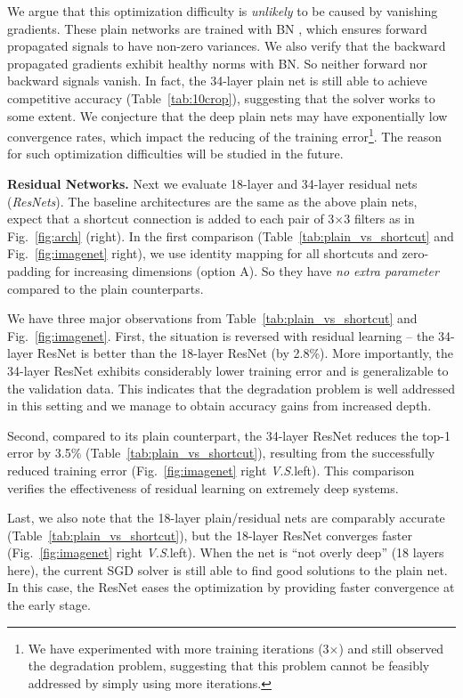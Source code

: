 \documentclass{article}
\newcommand{\vs}{\textit{V}.\textit{S}.}
\begin{document}
We argue that this optimization difficulty is \emph{unlikely} to be caused by vanishing gradients. These plain networks are trained with BN \cite{Ioffe2015}, which ensures forward propagated signals to have non-zero variances. We also verify that the backward propagated gradients exhibit healthy norms with BN. So neither forward nor backward signals vanish.
In fact, the 34-layer plain net is still able to achieve competitive accuracy (Table~\ref{tab:10crop}), suggesting that the solver works to some extent. We conjecture that the deep plain nets may have exponentially low convergence rates, which impact the reducing of the training error\footnote{We have experimented with more training iterations (3$\times$) and still observed the degradation problem, suggesting that this problem cannot be feasibly addressed by simply using more iterations.}.
The reason for such optimization difficulties will be studied in the future.

\vspace{6pt}
\noindent\textbf{Residual Networks.}
Next we evaluate 18-layer and 34-layer residual nets (\emph{ResNets}). The baseline architectures are the same as the above plain nets, expect that a shortcut connection is added to each pair of 3$\times$3 filters as in Fig.~\ref{fig:arch} (right). In the first comparison (Table~\ref{tab:plain_vs_shortcut} and Fig.~\ref{fig:imagenet} right), we use identity mapping for all shortcuts and zero-padding for increasing dimensions (option A). So they have \emph{no extra parameter} compared to the plain counterparts.

We have three major observations from Table~\ref{tab:plain_vs_shortcut} and Fig.~\ref{fig:imagenet}. First, the situation is reversed with residual learning -- the 34-layer ResNet is better than the 18-layer ResNet (by 2.8\%). More importantly, the 34-layer ResNet exhibits considerably lower training error and is generalizable to the validation data. This indicates that the degradation problem is well addressed in this setting and we manage to obtain accuracy gains from increased depth.

Second, compared to its plain counterpart, the 34-layer ResNet reduces the top-1 error by 3.5\% (Table~\ref{tab:plain_vs_shortcut}), resulting from the successfully reduced training error (Fig.~\ref{fig:imagenet} right \vs left). This comparison verifies the effectiveness of residual learning on extremely deep systems.

Last, we also note that the 18-layer plain/residual nets are comparably accurate (Table~\ref{tab:plain_vs_shortcut}), but the 18-layer ResNet converges faster (Fig.~\ref{fig:imagenet} right \vs left).
When the net is ``not overly deep'' (18 layers here), the current SGD solver is still able to find good solutions to the plain net. In this case, the ResNet eases the optimization by providing faster convergence at the early stage.
\end{document}
